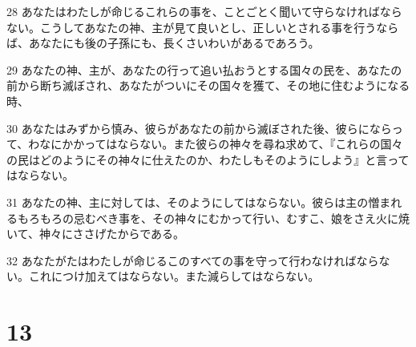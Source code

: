 \par 28 あなたはわたしが命じるこれらの事を、ことごとく聞いて守らなければならない。こうしてあなたの神、主が見て良いとし、正しいとされる事を行うならば、あなたにも後の子孫にも、長くさいわいがあるであろう。
\par 29 あなたの神、主が、あなたの行って追い払おうとする国々の民を、あなたの前から断ち滅ぼされ、あなたがついにその国々を獲て、その地に住むようになる時、
\par 30 あなたはみずから慎み、彼らがあなたの前から滅ぼされた後、彼らにならって、わなにかかってはならない。また彼らの神々を尋ね求めて、『これらの国々の民はどのようにその神々に仕えたのか、わたしもそのようにしよう』と言ってはならない。
\par 31 あなたの神、主に対しては、そのようにしてはならない。彼らは主の憎まれるもろもろの忌むべき事を、その神々にむかって行い、むすこ、娘をさえ火に焼いて、神々にささげたからである。
\par 32 あなたがたはわたしが命じるこのすべての事を守って行わなければならない。これにつけ加えてはならない。また減らしてはならない。

\chapter{13}

